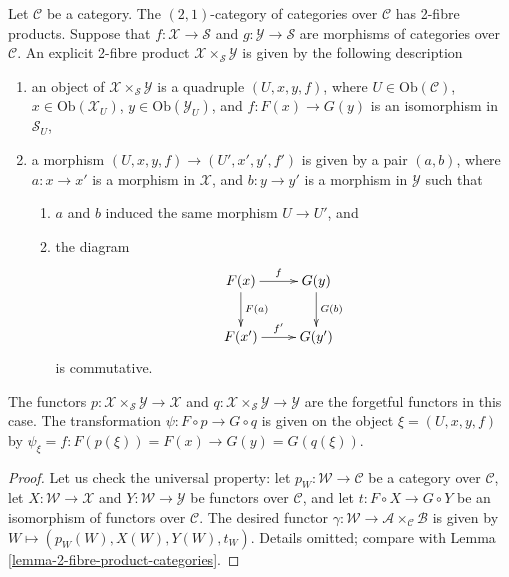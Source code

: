 \begin{lemma}
\label{lemma-2-product-categories-over-C}
Let $\mathcal{C}$ be a category.
The $(2, 1)$-category of categories
over $\mathcal{C}$ has 2-fibre products.
Suppose that
$f : \mathcal{X} \to \mathcal{S}$ and
$g : \mathcal{Y} \to \mathcal{S}$ are morphisms of categories over
$\mathcal{C}$.
An explicit 2-fibre product
$\mathcal{X} \times_\mathcal{S}\mathcal{Y}$ is given by the following
description
\begin{enumerate}
\item an object of $\mathcal{X}\times_\mathcal{S} \mathcal{Y}$ is a quadruple
$(U, x, y, f)$, where $U \in \text{Ob}(\mathcal{C})$,
$x\in \text{Ob}(\mathcal{X}_U)$, $y\in \text{Ob}(\mathcal{Y}_U)$,
and $f : F(x) \to G(y)$ is an isomorphism in $\mathcal{S}_U$,
\item a morphism $(U, x, y, f) \to (U', x', y', f')$ is given by a pair
$(a, b)$, where $a : x \to x'$ is a morphism in $\mathcal{X}$, and
$b : y \to y'$ is a
morphism in $\mathcal{Y}$ such that
\begin{enumerate}
\item $a$ and $b$ induced the same morphism $U \to U'$, and
\item the diagram
$$
\xymatrix{
F(x) \ar[r]^f \ar[d]^{F(a)} & G(y) \ar[d]^{G(b)} \\
F(x') \ar[r]^{f'} & G(y')
}
$$
is commutative.
\end{enumerate}
\end{enumerate}
The functors $p : \mathcal{X}\times_\mathcal{S}\mathcal{Y} \to \mathcal{X}$
and $q : \mathcal{X}\times_\mathcal{S}\mathcal{Y} \to \mathcal{Y}$ are the
forgetful functors in this case. The transformation $\psi : F \circ p \to
G \circ q$ is given on the object $\xi = (U, x, y, f)$ by
$\psi_\xi = f : F(p(\xi)) = F(x) \to G(y) = G(q(\xi))$.
\end{lemma}

\begin{proof}
Let us check the universal property: let $p_W : \mathcal{W}\to \mathcal{C}$
be a category over $\mathcal{C}$, let $X : \mathcal{W} \to \mathcal{X}$ and
$Y : \mathcal{W} \to \mathcal{Y}$ be functors over $\mathcal{C}$, and let
$t : F \circ X \to G \circ Y$ be an isomorphism of functors over $\mathcal{C}$.
The desired functor
$\gamma : \mathcal{W} \to \mathcal{A}\times_\mathcal{C}\mathcal{B}$
is given by $W \mapsto (p_W(W), X(W), Y(W), t_W)$.
Details omitted; compare with Lemma \ref{lemma-2-fibre-product-categories}.
\end{proof}

